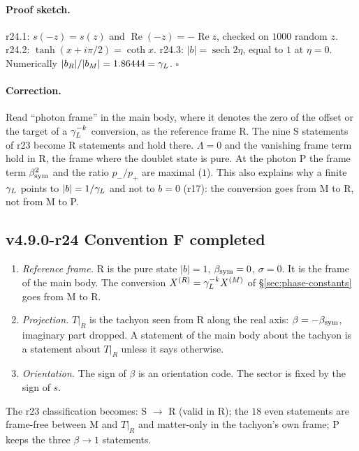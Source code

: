 \paragraph{Proof sketch.}
r24.1: \(s(-z)=s(z)\) and \(\operatorname{Re}(-z)=-\operatorname{Re}z\), checked on \(1000\) random \(z\).  r24.2: \(\tanh(x+i\pi/2)=\coth x\).
r24.3: \(|b|=\operatorname{sech}2\eta\), equal to \(1\) at \(\eta=0\).  Numerically \(|b_R|/|b_M|=1.86444=\gamma_L\).  \(\square\)

\paragraph{Correction.}
Read ``photon frame'' in the main body, where it denotes the zero of the offset or the target of a \(\gamma_L^{-k}\) conversion, as the
reference frame R.  The nine S statements of r23 become R statements and hold there.  \(\Lambda=0\) and the vanishing frame term
hold in R, the frame where the doublet state is pure.  At the photon P the frame term \(\beta_{\mathrm{sym}}^2\) and the ratio \(p_-/p_+\) are
maximal (\(1\)).  This also explains why a finite \(\gamma_L\) points to \(|b|=1/\gamma_L\) and not to \(b=0\) (r17): the conversion goes from M to
R, not from M to P.

\subsection*{v4.9.0-r24 Convention F completed}
\label{subsec:v490-r24-convention}

\begin{enumerate}[leftmargin=2em]
\item[(F5)] \emph{Reference frame.}  R is the pure state \(|b|=1\), \(\beta_{\mathrm{sym}}=0\), \(\sigma=0\).  It is the frame of the main body.  The
conversion \(X^{(R)}=\gamma_L^{-k}X^{(M)}\) of \S\ref{sec:phase-constants} goes from M to R.
\item[(F6)] \emph{Projection.}  \(T|_R\) is the tachyon seen from R along the real axis: \(\beta=-\beta_{\mathrm{sym}}\), imaginary part dropped.  A
statement of the main body about the tachyon is a statement about \(T|_R\) unless it says otherwise.
\item[(F7)] \emph{Orientation.}  The sign of \(\beta\) is an orientation code.  The sector is fixed by the sign of \(s\).
\end{enumerate}
The r23 classification becomes: S \(\to\) R (valid in R); the \(18\) even statements are frame-free between M and \(T|_R\) and
matter-only in the tachyon's own frame; P keeps the three \(\beta\to1\) statements.

